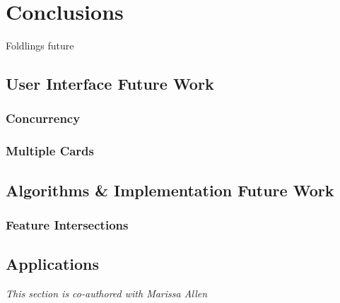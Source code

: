 \chapter{Conclusions}

Foldlings future

\section{User Interface Future Work}\label{user-interface-future-work}

\subsection{Concurrency}\label{concurrency}

\subsection{Multiple Cards}\label{multiple-cards}

\section{Algorithms \& Implementation Future
Work}\label{algorithms-implementation-future-work}

\subsection{Feature Intersections}\label{feature-intersections}

\section{Applications}\label{applications}

\emph{This section is co-authored with Marissa Allen}
